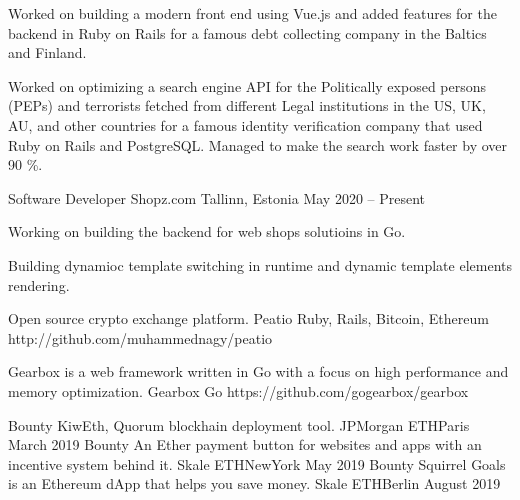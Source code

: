 \documentclass[]{awesome-cv}
\begin{document}
\begin{cventries}
	{\begin{cvitems}
		\item {Worked on building a modern front end using Vue.js and added features for the backend in Ruby on Rails for a famous debt collecting company in the Baltics and Finland.}
		\item {Worked on optimizing a search engine API for the Politically exposed persons (PEPs) and terrorists fetched from different Legal institutions in the US, UK, AU, and other countries for a famous identity verification company that used Ruby on Rails and PostgreSQL. Managed to make the search work faster by over 90 \%.}
		\end{cvitems}}
	\cventry
	{Software Developer}
	{Shopz.com}
	{Tallinn, Estonia}
	{May 2020 – Present}
	{\begin{cvitems}
		\item {Working on building the backend for web shops solutioins in Go.}
		\item {Building dynamioc template switching in runtime and dynamic template elements rendering.}
		\end{cvitems}}
\end{cventries}

\vspace{-7mm}

\begin{cventries}
	\cventry
	{Open source crypto exchange platform.}
	{Peatio}
	{Ruby, Rails, Bitcoin, Ethereum}
	{http://github.com/muhammednagy/peatio}
	{}
	
	\vspace{-6mm}
	\cventry
	{Gearbox is a web framework written in Go with a focus on high performance and memory optimization.}
	{Gearbox}
	{Go}
	{https://github.com/gogearbox/gearbox}
	{}
	
	\vspace{-6mm}
\end{cventries}

\begin{cvhonors}
	\cvhonor
	{Bounty}
	{KiwEth, Quorum blockhain deployment tool.}
	{JPMorgan ETHParis}
	{March 2019}
	\cvhonor
	{Bounty}
	{An Ether payment button for websites and apps with an incentive system behind it.}
	{Skale ETHNewYork}
	{May 2019}
	\cvhonor
	{Bounty}
	{Squirrel Goals is an Ethereum dApp that helps you save money.}
	{Skale ETHBerlin}
	{August 2019}
\end{cvhonors}
\ 
\end{document}
